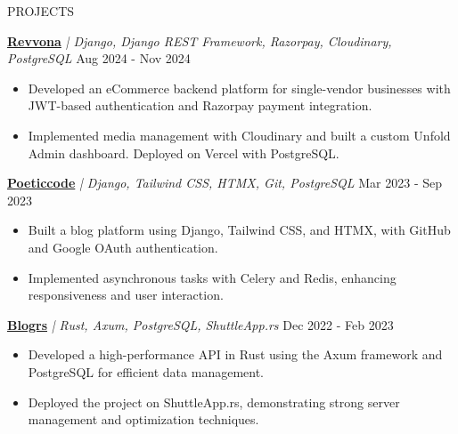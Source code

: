 \documentclass{style} %
\begin{document}

\begin{rSection}{PROJECTS}
  \vspace{-1.25em}
  \item \textbf{\href{https://github.com/izharxyz/revvona}{Revvona}} \textit{| Django, Django REST Framework, Razorpay, Cloudinary, PostgreSQL} \hfill Aug 2024 - Nov 2024
  \begin{itemize}
    \itemsep -3pt {} 
    \item Developed an eCommerce backend platform for single-vendor businesses with JWT-based authentication and Razorpay payment integration.
    \item Implemented media management with Cloudinary and built a custom Unfold Admin dashboard. Deployed on Vercel with PostgreSQL.
  \end{itemize}

  \item \textbf{\href{https://github.com/izharxyz/neon}{Poeticcode}} \textit{| Django, Tailwind CSS, HTMX, Git, PostgreSQL} \hfill Mar 2023 - Sep 2023
  \begin{itemize}
    \itemsep -3pt {} 
    \item Built a blog platform using Django, Tailwind CSS, and HTMX, with GitHub and Google OAuth authentication.
    \item Implemented asynchronous tasks with Celery and Redis, enhancing responsiveness and user interaction.
  \end{itemize}

  \item \textbf{\href{https://github.com/izharxyz/blogrs}{Blogrs}} \textit{| Rust, Axum, PostgreSQL, ShuttleApp.rs} \hfill Dec 2022 - Feb 2023
  \begin{itemize}
    \itemsep -3pt {} 
    \item Developed a high-performance API in Rust using the Axum framework and PostgreSQL for efficient data management.
    \item Deployed the project on ShuttleApp.rs, demonstrating strong server management and optimization techniques.
  \end{itemize}
\end{rSection}


\end{document}
